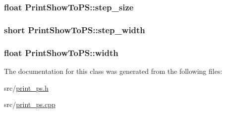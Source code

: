 \hypertarget{a00118_adcc58ec30b8188b8cb10a8516f7d3f46}{
\subsubsection[{step\-\_\-size}]{\setlength{\rightskip}{0pt plus 5cm}float Print\-Show\-To\-P\-S\-::step\-\_\-size\hspace{0.3cm}{\ttfamily [private]}}}\label{a00118_adcc58ec30b8188b8cb10a8516f7d3f46}
\hypertarget{a00118_ab4edd8fa1bf5977aa65974fe72c8afcd}{
\subsubsection[{step\-\_\-width}]{\setlength{\rightskip}{0pt plus 5cm}short Print\-Show\-To\-P\-S\-::step\-\_\-width\hspace{0.3cm}{\ttfamily [private]}}}\label{a00118_ab4edd8fa1bf5977aa65974fe72c8afcd}
\hypertarget{a00118_a1b34fecf2552966f482b6cce79d6ff62}{
\subsubsection[{width}]{\setlength{\rightskip}{0pt plus 5cm}float Print\-Show\-To\-P\-S\-::width\hspace{0.3cm}{\ttfamily [private]}}}\label{a00118_a1b34fecf2552966f482b6cce79d6ff62}


The documentation for this class was generated from the following files\-:\begin{DoxyCompactItemize}
\item 
src/\hyperlink{a00239}{print\-\_\-ps.\-h}\item 
src/\hyperlink{a00238}{print\-\_\-ps.\-cpp}\end{DoxyCompactItemize}
